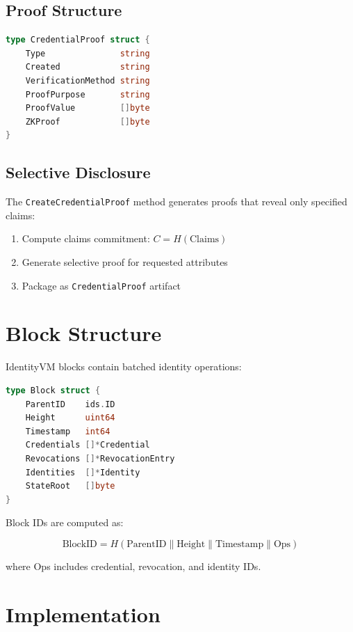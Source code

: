 \documentclass[11pt,twocolumn]{article}
\begin{document}
\subsection{Proof Structure}

\begin{lstlisting}[language=Go,basicstyle=\ttfamily\small]
type CredentialProof struct {
    Type               string
    Created            string
    VerificationMethod string
    ProofPurpose       string
    ProofValue         []byte
    ZKProof            []byte
}
\end{lstlisting}

\subsection{Selective Disclosure}

The \texttt{CreateCredentialProof} method generates proofs that reveal only specified claims:

\begin{enumerate}
\item Compute claims commitment: $C = H(\text{Claims})$
\item Generate selective proof for requested attributes
\item Package as \texttt{CredentialProof} artifact
\end{enumerate}

\section{Block Structure}

IdentityVM blocks contain batched identity operations:

\begin{lstlisting}[language=Go,basicstyle=\ttfamily\small]
type Block struct {
    ParentID    ids.ID
    Height      uint64
    Timestamp   int64
    Credentials []*Credential
    Revocations []*RevocationEntry
    Identities  []*Identity
    StateRoot   []byte
}
\end{lstlisting}

Block IDs are computed as:

\begin{equation}
\text{BlockID} = H(\text{ParentID} \| \text{Height} \| \text{Timestamp} \| \text{Ops})
\end{equation}

where Ops includes credential, revocation, and identity IDs.

\section{Implementation}
\end{document}
